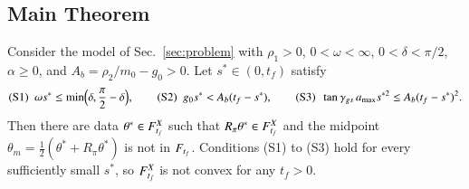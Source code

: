 \subsection{Main Theorem}
\begin{theorem}\label{thm:Bstar}
Consider the model of Sec.~\ref{sec:problem} with $\rho_1>0$, $0<\omega<\infty$, $0<\delta<\pi/2$, $\alpha\ge0$, and
$A_b=\rho_2/m_0-g_0>0$. Let $s^*\in(0,t_f)$ satisfy
\begin{equation}\label{eq:S}
\text{(S1)}\ \ \omega s^*\le\min\Bigl(\delta,\frac\pi2-\delta\Bigr),\qquad
\text{(S2)}\ \ g_0s^*<A_b(t_f-s^*),\qquad
\text{(S3)}\ \ \tan\gamma_{gs}\,a_{\max}s^{*2}\le A_b(t_f-s^*)^2 .
\end{equation}
Then there are data $\theta^*\in F^{X}_{t_f}$ such that $R_\pi\theta^*\in F^{X}_{t_f}$ and the midpoint
$\theta_m=\tfrac12(\theta^*+R_\pi\theta^*)$ is not in $F_{t_f}$. Conditions (S1) to (S3) hold for every sufficiently small $s^*$,
so $F^{X}_{t_f}$ is not convex for any $t_f>0$.
\end{theorem}
